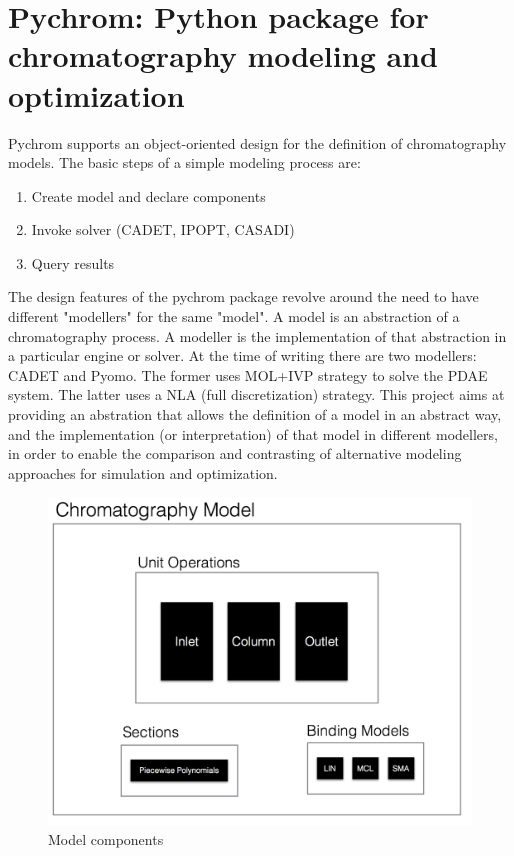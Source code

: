 \documentclass[paper=a4, fontsize=11pt]{scrartcl}
\begin{document}
\section{Pychrom: Python package for chromatography modeling and optimization}

Pychrom supports an object-oriented design for the definition of chromatography models. The basic steps of a simple modeling process are:

\begin{enumerate}
\item Create model and declare components

\item Invoke solver (CADET, IPOPT, CASADI)

\item Query results
\end{enumerate}

The design features of the pychrom package revolve around the need to have different "modellers" for the same "model". A model is an abstraction of a chromatography process. A modeller is the implementation of that abstraction in a particular engine or solver. At the time of writing there are two modellers: CADET and Pyomo. The former uses MOL+IVP strategy to solve the PDAE system. The latter uses a NLA (full discretization) strategy. This project aims at providing an abstration that allows the definition of a model in an abstract way, and the implementation (or interpretation) of that model in different modellers, in order to enable the comparison and contrasting of alternative modeling approaches for simulation and optimization.

\begin{figure}[!h]
\label{objects}
\centering
\includegraphics[width=\textwidth]{boxes.png}
\caption{Model components}
\end{figure}
\end{document}
